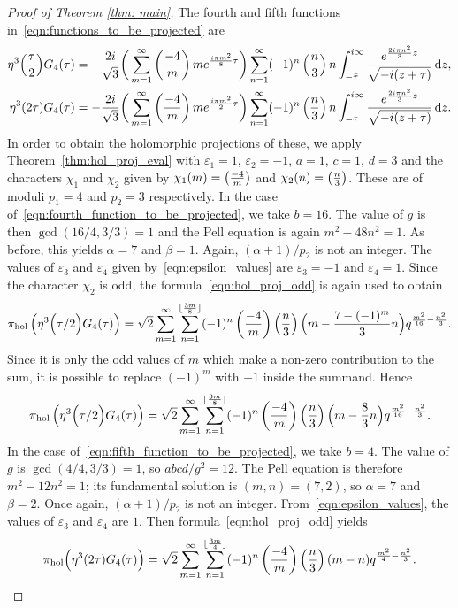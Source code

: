 \documentclass[11pt,reqno]{amsart}
\newcommand{\holoproj}[1]{\pi_{\mathrm{hol}}\left(#1\right)}
\renewcommand{\=}{\;=\;}
\theoremstyle{myremark}
\newcommand{\dd}{\mathrm{d}}
\begin{document}
\begin{proof}[Proof of Theorem \ref{thm: main}]
The fourth and fifth functions in~\eqref{eqn:functions_to_be_projected} are
\begin{align}
\eta^3\Big({\tau \over 2}\Big)G_{4}(\tau)&= -{2i \over \sqrt{3}} \bigg( \sum_{m=1}^\infty \left({-4 \over m}\right) m e^{{i\pi m^2 \over 8}\tau} \bigg) \sum_{n=1}^\infty (-1)^n \left({n \over 3}\right) n \int_{-\bar{\tau}}^{i\infty} {e^{{2i\pi n^2 \over 3}z} \over \sqrt{-i(z+\tau)}} \, \dd z, \label{eqn:fourth_function_to_be_projected} \\
\eta^3(2\tau)G_{4}(\tau) &= -{2i \over \sqrt{3}} \bigg( \sum_{m=1}^\infty \left({-4 \over m}\right) m e^{{i\pi m^2 \over 2}\tau} \bigg) \sum_{n=1}^\infty (-1)^n \left({n \over 3}\right) n \int_{-\bar{\tau}}^{i\infty} {e^{{2i\pi n^2 \over 3}z} \over \sqrt{-i(z+\tau)}} \, \dd z. \label{eqn:fifth_function_to_be_projected}
\end{align}
In order to obtain the holomorphic projections of these, we apply Theorem~\ref{thm:hol_proj_eval} with $\varepsilon_1=1$, $\varepsilon_2=-1$, $a=1$, $c=1$, $d=3$ and the characters $\chi_1$ and $\chi_2$ given by $\chi_1(m)=\left({-4\over m}\right)$ and $\chi_2(n)=\left({n\over 3}\right)$. These are of moduli $p_1=4$ and $p_2=3$ respectively.
In the case of~\eqref{eqn:fourth_function_to_be_projected}, we take $b=16$. The value of $g$ is then $\gcd(16/4,3/3)=1$ and the Pell equation is again $m^2-48n^2=1$. As before, this yields $\alpha=7$ and $\beta=1$. Again, $(\alpha+1)/p_2$ is not an integer. The values of $\varepsilon_3$ and $\varepsilon_4$ given by~\eqref{eqn:epsilon_values} are $\varepsilon_3=-1$ and $\varepsilon_4=1$. Since the character $\chi_2$ is odd, the formula~\eqref{eqn:hol_proj_odd} is again used to obtain
\[ 
\holoproj{\eta^3\Big({\tau / 2}\Big)G_{4}(\tau)} = \sqrt{2} \sum_{m=1}^\infty \sum_{n=1}^{\lfloor {3m \over 8}\rfloor} (-1)^n \left({-4 \over m}\right) \left({n \over 3}\right) \Big( m-{7-(-1)^m \over 3}n \Big) q^{{m^2 \over 16}-{n^2 \over 3}}. \]
Since it is only the odd values of $m$ which make a non-zero contribution to the sum, it is possible to replace $(-1)^m$ with $-1$ inside the summand. Hence
\[ 
\holoproj{\eta^3\Big({\tau / 2}\Big)G_{4}(\tau)} = \sqrt{2} \sum_{m=1}^\infty \sum_{n=1}^{\lfloor {3m \over 8}\rfloor} (-1)^n \left({-4 \over m}\right) \left({n \over 3}\right) \Big( m-{8 \over 3}n \Big) q^{{m^2 \over 16}-{n^2 \over 3}}. 
\]
In the case of~\eqref{eqn:fifth_function_to_be_projected}, we take $b=4$. The value of $g$ is $\gcd(4/4,3/3)=1$, so $abcd/g^2=12$. The Pell equation is therefore $m^2-12n^2=1$; its fundamental solution is $(m,n)=(7,2)$, so $\alpha=7$ and $\beta=2$. Once again, $(\alpha+1)/p_2$ is not an integer. From~\eqref{eqn:epsilon_values}, the values of $\varepsilon_3$ and $\varepsilon_4$ are $1$. Then formula~\eqref{eqn:hol_proj_odd} yields
\[ \pi_\text{hol}\Big( \eta^3(2\tau) G_{4}(\tau) \Big) = \sqrt{2} \sum_{m=1}^\infty \sum_{n=1}^{\lfloor {3m \over 4}\rfloor} (-1)^n \left({-4 \over m}\right) \left({n \over 3}\right) (m-n)q^{{m^2 \over 4}-{n^2 \over 3}}. \]


\end{proof}
\end{document}
